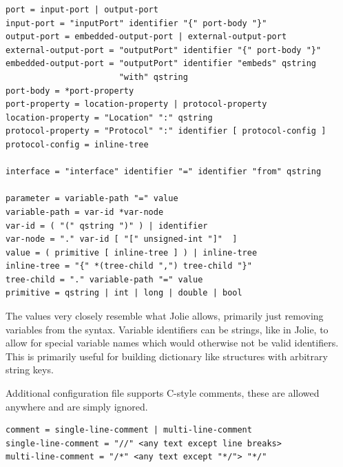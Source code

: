 \begin{verbatim}
port = input-port | output-port
input-port = "inputPort" identifier "{" port-body "}"
output-port = embedded-output-port | external-output-port
external-output-port = "outputPort" identifier "{" port-body "}"
embedded-output-port = "outputPort" identifier "embeds" qstring
                       "with" qstring
port-body = *port-property
port-property = location-property | protocol-property
location-property = "Location" ":" qstring
protocol-property = "Protocol" ":" identifier [ protocol-config ]
protocol-config = inline-tree

interface = "interface" identifier "=" identifier "from" qstring

parameter = variable-path "=" value
variable-path = var-id *var-node
var-id = ( "(" qstring ")" ) | identifier
var-node = "." var-id [ "[" unsigned-int "]"  ]
value = ( primitive [ inline-tree ] ) | inline-tree
inline-tree = "{" *(tree-child ",") tree-child "}"
tree-child = "." variable-path "=" value
primitive = qstring | int | long | double | bool
\end{verbatim}

The values very closely resemble what Jolie allows, primarily just removing
variables from the syntax. Variable identifiers can be strings, like in Jolie,
to allow for special variable names which would otherwise not be
valid identifiers. This is primarily useful for building dictionary like
structures with arbitrary string keys.

Additional configuration file supports C-style comments, these are allowed
anywhere and are simply ignored.

\begin{verbatim}
comment = single-line-comment | multi-line-comment
single-line-comment = "//" <any text except line breaks>
multi-line-comment = "/*" <any text except "*/"> "*/"
\end{verbatim}

